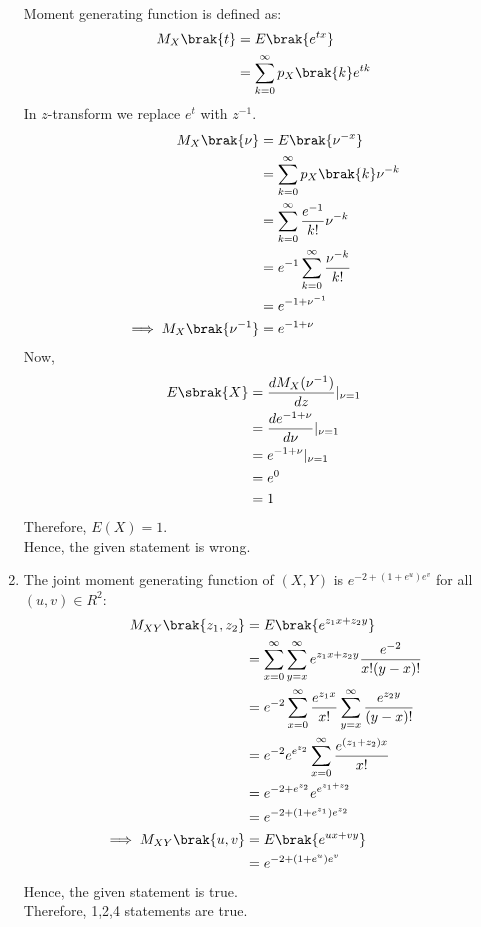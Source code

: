 \documentclass[journal,12pt,twocolumn]{IEEEtran}
\theoremstyle{remark}
\begin{document}
\begin{enumerate}
\begin{align}
\end{align}
Moment generating function is defined as:
\begin{align}
M_X\brak{t} &= E\brak{e^{tx}}\\
&= \sum_{k=0}^{\infty} p_X\brak{k}e^{tk}
\end{align}
In $z$-transform we replace $e^{t}$ with $z^{-1}$.\\
\begin{align}
M_X\brak{\nu} &= E\brak{\nu^{-x}}\\
&= \sum_{k=0}^{\infty} p_X\brak{k}\nu^{-k}\\
&= \sum_{k=0}^{\infty} \frac{e^{-1}}{k!}\nu^{-k}\\
&= e^{-1} \sum_{k=0}^{\infty} \frac{\nu^{-k}}{k!}\\
&= e^{-1+\nu^{-1}}\\
\implies M_X\brak{\nu^{-1}} &= e^{-1+\nu}
\end{align}
Now,
\begin{align}
E\sbrak{X}&= \frac{dM_{X}(\nu^{-1})}{dz}\vert_{\nu=1}\\
&= \frac{de^{-1+\nu}}{d\nu}\vert_{\nu=1}\\
&= e^{-1+\nu}\vert_{\nu=1}\\
&= e^{0}\\
&= 1
\end{align}
Therefore, ${E(X) = 1}$.\\
Hence, the given statement is wrong.
\item The joint moment generating function of $(X,Y)$ is $e^{-2+(1 + e^u)e^v}$ for all $(u,v) \in {R^2}$:
\begin{align}
M_{XY}\brak{z_1,z_2} &= E\brak{e^{z_1x+z_2y}}\\
&= \sum_{x=0}^{\infty} \sum_{y=x}^{\infty} e^{z_1x+z_2y}\frac{e^{-2}}{x!(y - x)!}\\
&= e^{-2} \sum_{x=0}^{\infty} \frac{e^{z_1x}}{x!} \sum_{y=x}^{\infty}\frac{e^{z_2y}}{(y - x)!}\\
&= e^{-2}e^{e^{z_2}}\sum_{x=0}^{\infty} \frac{e^{(z_1+z_2)x}}{x!}\\
&= e^{-2+e^{z_2}}e^{e^{z_1+z_2}}\\
&= e^{-2+(1 + e^{z_1})e^{z_2}}\\
\implies M_{XY}\brak{u,v} &= E\brak{e^{ux+vy}}\\
&= e^{-2+(1 + e^u)e^v}
\end{align}
Hence, the given statement is true.\\
Therefore, 1,2,4 statements are true.
\end{enumerate}
\end{document}
